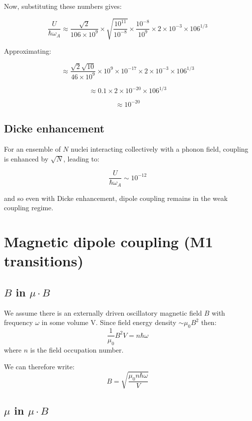 \documentclass[
]{article}
\renewcommand{\[}{\begin{equation}}
\renewcommand{\]}{\end{equation}}
\begin{document}
Now, substituting these numbers gives:

\[
\frac{U}{\hbar \omega_A} \approx \frac{\sqrt{2} }{106 \times 10^9} \times \sqrt{\frac{10^{11}}{10^{-8}}} \times \frac{10^{-8}}{10^9} \times 2 \times 10^{-3} \times 106^{1/3}
\]

Approximating:

\[
\approx \frac{\sqrt{2} \sqrt{10}}{46 \times 10^9} \times 10^9 \times 10^{-17} \times 2 \times 10^{-3} \times 106^{1/3}
\]

\[
\approx 0.1 \times 2 \times 10^{-20} \times 106^{1/3}
\]

\[
\approx 10^{-20}
\]

\subsection{Dicke enhancement}\label{dicke-enhancement-1}

For an ensemble of \(N\) nuclei interacting collectively with a phonon
field, coupling is enhanced by \(\sqrt{N}\), leading to:

\[
\frac{U}{\hbar \omega_A} \sim 10^{-12}
\]

and so even with Dicke enhancement, dipole coupling remains in the weak
coupling regime.

\section{Magnetic dipole coupling (M1
transitions)}\label{magnetic-dipole-coupling-m1-transitions}

\subsection{\texorpdfstring{\(B\) in
\(\mu\cdot B\)}{B in \textbackslash mu\textbackslash cdot B}}\label{b-in-mucdot-b}

We assume there is an externally driven oscillatory magnetic field \(B\)
with frequency \(\omega\) in some volume V. Since field energy density
\(\sim \mu_0B^2\) then: \[
\frac{1}{\mu_0} B^2 V = n\hbar\omega
\] where \(n\) is the field occupation number.

We can therefore write: \[
B = \sqrt{\frac{\mu_0n\hbar\omega}{V}}
\label{eq:B}
\]

\subsection{\texorpdfstring{\(\mu\) in
\(\mu \cdot B\)}{\textbackslash mu in \textbackslash mu \textbackslash cdot B}}\label{mu-in-mu-cdot-b}
\end{document}
